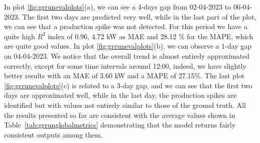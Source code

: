 In plot \ref{fig:grrunevalplots}(a), we can see a 4-days gap from 02-04-2023 to 06-04-2023.
The first two days are predicted very well, while in the last part of the plot,
we can see that a production spike was not detected.
For this period we have a quite high $R^2$ index of 0.96, 4.72 kW as MAE and 28.12 \%  for the MAPE, which are quite good values.
In plot \ref{fig:grrunevalplots}(b), we can observe a 1-day gap on 04-04-2023. We notice that the overall trend is almost entirely approximated correctly, except for some time intervals around 12:00, indeed, we have slightly better results with an MAE of 3.60 kW and a MAPE of 27.15\%.
The last plot \ref{fig:grrunevalplots}(c) is related to a 3-day gap, and we can see that the first two days are approximated well, while in the last day, the production spikes are identified but with values not entirely similar to those of the ground truth.
All the results presented so far are consistent with the average values shown in Table~\ref{tab:grrunglobalmetrics} demonstrating that the model returns fairly consistent outputs among them.

